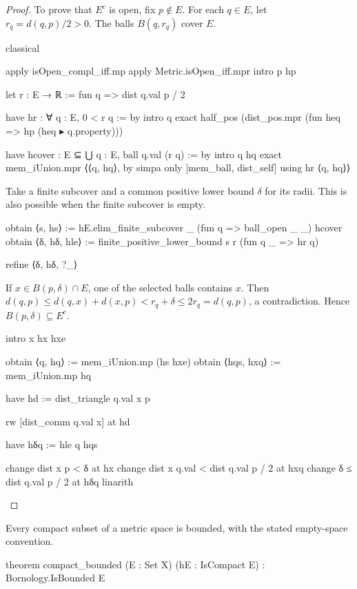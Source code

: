\begin{proof}
  To prove that $E^{c}$ is open, fix $p\notin E$.
  For each $q\in E$, let $r_q=d(q,p)/2>0$.
  The balls $B(q,r_q)$ cover $E$.

  \begin{lean}
    classical

    apply isOpen_compl_iff.mp
    apply Metric.isOpen_iff.mpr
    intro p hp

    let r : E → ℝ := fun q => dist q.val p / 2

    have hr : ∀ q : E, 0 < r q := by
      intro q
      exact half_pos (dist_pos.mpr (fun heq => hp (heq ▸ q.property)))

    have hcover : E ⊆ ⋃ q : E, ball q.val (r q) := by
      intro q hq
      exact mem_iUnion.mpr ⟨⟨q, hq⟩, by simpa only [mem_ball, dist_self] using hr ⟨q, hq⟩⟩
  \end{lean}

  Take a finite subcover and a common positive lower bound $\delta$ for its radii.
  This is also possible when the finite subcover is empty.

  \begin{lean}
    obtain ⟨s, hs⟩ := hE.elim_finite_subcover _ (fun q => ball_open _ _) hcover
    obtain ⟨δ, hδ, hle⟩ := finite_positive_lower_bound s r (fun q _ => hr q)

    refine ⟨δ, hδ, ?_⟩
  \end{lean}

  If $x\in B(p,\delta)\cap E$, one of the selected balls contains $x$.
  Then $d(q,p)\leq d(q,x)+d(x,p)<r_q+\delta\leq 2r_q=d(q,p)$, a contradiction.
  Hence $B(p,\delta)\subseteq E^{c}$.

  \begin{lean}
    intro x hx hxe

    obtain ⟨q, hq⟩ := mem_iUnion.mp (hs hxe)
    obtain ⟨hqs, hxq⟩ := mem_iUnion.mp hq

    have hd := dist_triangle q.val x p

    rw [dist_comm q.val x] at hd

    have hδq := hle q hqs

    change dist x p < δ at hx
    change dist x q.val < dist q.val p / 2 at hxq
    change δ ≤ dist q.val p / 2 at hδq
    linarith
  \end{lean}

\end{proof}

\begin{proposition}
  \label{ma:thm:compact-set-is-bounded}
  Every compact subset of a metric space is bounded, with the stated empty-space convention.

  \begin{lean}
    theorem compact_bounded (E : Set X) (hE : IsCompact E) : Bornology.IsBounded E
  \end{lean}
\end{proposition}

